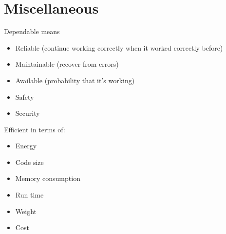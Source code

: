 \section{Miscellaneous}
Dependable means
\begin{itemize}
	\item Reliable (continue working correctly when it worked correctly before)
	\item Maintainable (recover from errors)
	\item Available	(probability that it's working)
	\item Safety
	\item Security
\end{itemize}

Efficient in terms of:
\begin{itemize}
	\item Energy
	\item Code size
	\item Memory consumption
	\item Run time
	\item Weight
	\item Cost
\end{itemize}
